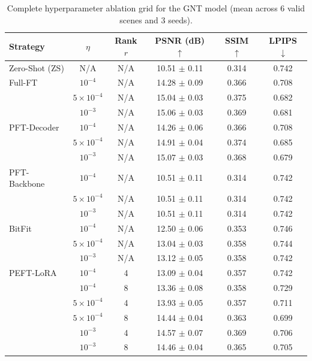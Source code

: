 \begin{table}[H]
\centering
\caption{Complete hyperparameter ablation grid for the GNT model (mean across 6 valid scenes and 3 seeds).}
\label{tab:gnt_full_grid_search}
\scriptsize
\begin{tabular*}{\linewidth}{@{\extracolsep{\fill}}lccccc@{\extracolsep{0pt}}}
\toprule
Strategy & $\eta$ & Rank $r$ & PSNR (dB) $\uparrow$ & SSIM $\uparrow$ & LPIPS $\downarrow$ \\
\midrule
Zero-Shot (ZS)     & N/A        & N/A    & 10.51 $\pm$ 0.11         & 0.314    & 0.742    \\
\midrule
Full-FT            & $10^{-4}$  & N/A    & 14.28 $\pm$ 0.09         & 0.366    & 0.708    \\
                   & $5\times10^{-4}$ & N/A    & 15.04 $\pm$ 0.03         & 0.375    & 0.682    \\
                   & $10^{-3}$  & N/A    & 15.06 $\pm$ 0.03         & 0.369    & 0.681    \\
\midrule
PFT-Decoder        & $10^{-4}$  & N/A    & 14.26 $\pm$ 0.06         & 0.366    & 0.708    \\
                   & $5\times10^{-4}$ & N/A    & 14.91 $\pm$ 0.04         & 0.374    & 0.685    \\
                   & $10^{-3}$  & N/A    & 15.07 $\pm$ 0.03         & 0.368    & 0.679    \\
\midrule
PFT-Backbone       & $10^{-4}$  & N/A    & 10.51 $\pm$ 0.11         & 0.314    & 0.742    \\
                   & $5\times10^{-4}$ & N/A    & 10.51 $\pm$ 0.11         & 0.314    & 0.742    \\
                   & $10^{-3}$  & N/A    & 10.51 $\pm$ 0.11         & 0.314    & 0.742    \\
\midrule
BitFit             & $10^{-4}$  & N/A    & 12.50 $\pm$ 0.06         & 0.353    & 0.746    \\
                   & $5\times10^{-4}$ & N/A    & 13.04 $\pm$ 0.03         & 0.358    & 0.744    \\
                   & $10^{-3}$  & N/A    & 13.12 $\pm$ 0.05         & 0.358    & 0.742    \\
\midrule
PEFT-LoRA          & $10^{-4}$  & 4      & 13.09 $\pm$ 0.04         & 0.357    & 0.742    \\
                   & $10^{-4}$  & 8      & 13.36 $\pm$ 0.08         & 0.358    & 0.729    \\
                   & $5\times10^{-4}$ & 4      & 13.93 $\pm$ 0.05         & 0.357    & 0.711    \\
                   & $5\times10^{-4}$ & 8      & 14.44 $\pm$ 0.04         & 0.363    & 0.699    \\
                   & $10^{-3}$  & 4      & 14.57 $\pm$ 0.07         & 0.369    & 0.706    \\
                   & $10^{-3}$  & 8      & 14.46 $\pm$ 0.04         & 0.365    & 0.705    \\
\bottomrule
\end{tabular*}
\end{table}
